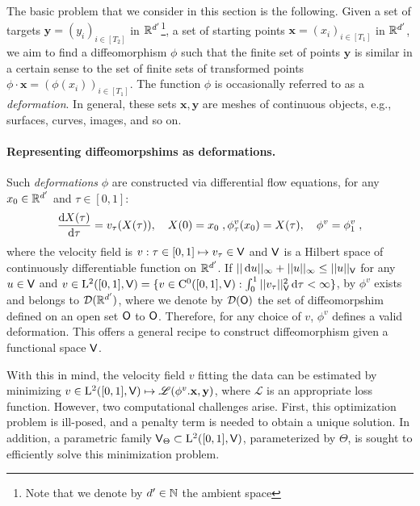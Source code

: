 The basic problem that we consider in this section is the following. Given a set of targets $\mathbf{y}=(y_i)_{i\in[T_2]}$ in $\mathbb{R}^{d'}$\footnote{Note that we denote by $d'\in\mathbb{N}$ the ambient space}, a set of starting points $\mathbf{x}=(x_{i})_{i\in[T_1]}$ in $\mathbb{R}^{d'}$, we aim to find a diffeomorphism $\phi$ such that the finite set of points $\mathbf{y}$ is similar in a certain sense to the set of finite sets of transformed points $\phi \cdot \mathbf{x} =(\phi(x_i))_{i\in[T_1]} $. The function $\phi$ is occasionally referred to as a \textit{deformation}. In general, these sets $\mathbf{x},\mathbf{y}$ are meshes of continuous objects, e.g., surfaces, curves, images, and so on.

\vspace{-1ex}
\paragraph{Representing diffeomorpshims as deformations.}
Such \textit{deformations} $\phi$ are constructed via differential flow equations, for any $x_0\in \mathbb{R}^{d'} $ and $\tau\in[0,1]$:
\begin{equation}
  \label{eq:LDDMM_dynamic}
    \frac{\mathop{}\!\mathrm{d} X(\tau)}{\mathop{}\!\mathrm{d} \tau}= v_\tau(X(\tau)), \quad X(0)=x_0\; ,
    \phi^v_\tau(x_0)=X(\tau), \quad \phi^v=\phi^v_1  \; ,
\end{equation}
where the velocity field is $v:\tau\in [0,1]\mapsto v_\tau\in \mathsf{V} $ and $\mathsf{V}$ is a Hilbert space of continuously differentiable function on $\mathbb{R}^{d'}$. If $||\mathop{}\!\mathrm{d} u ||_{\infty}+|| u ||_{\infty}\leq ||u ||_{\mathsf{V}} $ for any $u\in \mathsf{V}$ and $v\in \mathrm{L}^2([0,1],\mathsf{V})=\{v\in \mathrm{C}^0([0,1],\mathsf{V}): \int_0^1 ||v_\tau||^2_{\mathsf{V}} \mathop{}\!\mathrm{d} \tau<\infty \} $, by \citep[Theorem 5]{glaunes2005transport} $\phi^v$ exists and belongs to $\mathcal{D}(\mathbb{R}^{d'})$, where we denote by $\mathcal{D}(\mathsf{O}) $ the set of diffeomorpshim defined on an open set $\mathsf{O}$ to $\mathsf{O}$. Therefore, for any choice of $v$, $\phi^v$ defines a valid deformation. This offers a general recipe to construct diffeomorphism given a functional space $\mathsf{V}$.

With this in mind, the velocity field $v$ fitting the data can be estimated by minimizing $v \in \mathrm{L}^2([0,1],\mathsf{V}) \mapsto \mathscr{L}(\phi^{v}.\mathbf{x},\mathbf{y})$, where $\mathscr{L}$ is an appropriate loss function. However, two computational challenges arise. First, this optimization problem is ill-posed, and a penalty term is needed to obtain a unique solution. In addition, a parametric family $\mathsf{V}_{\Theta} \subset \mathrm{L}^2([0,1],\mathsf{V})$, parameterized by $\Theta$, is sought to efficiently solve this minimization problem.


